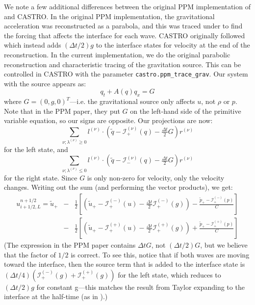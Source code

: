 \documentclass[iop]{../emulateapj}
\newcommand{\evm}{{(-)}}
\newcommand{\evp}{{(+)}}
\newcommand{\enu}{{(\nu)}}
\begin{document}
We note a few additional differences between the original PPM
implementation of \citet{ppm} and CASTRO.  In the original PPM
implementation, the gravitational acceleration was reconstructed as a parabola, and
this was traced under to find the forcing that affects the interface
for each wave.  CASTRO originally followed \citet{ppmunsplit} which instead adds
$(\Delta t/2)g$ to the interface states for velocity at the end of the
reconstruction.  In the current implementation, we do the original
parabolic reconstruction and characteristic tracing of the gravitation
source. This can be controlled in CASTRO with the parameter 
{\tt castro.ppm\_trace\_grav}. Our system with the source appears as:
\begin{equation}
q_t + A(q) q_x = G
\end{equation}
where $G = (0, g, 0)^T$---i.e. the gravitational source only affects
$u$, not $\rho$ or $p$.  Note that in the PPM paper, they put $G$ on 
the left-hand side of the primitive variable equation, so our signs are
opposite.  Our projections are now:
\begin{equation}
\sum_{\nu; \lambda^\enu \ge 0}l^\enu \cdot (\tilde{q} - \mathcal{I}^\enu_+(q) - \tfrac{\Delta t}{2} G) r^\enu
\end{equation}
for the left state, and
\begin{equation}
\sum_{\nu; \lambda^\enu \le 0} l^\enu \cdot (\tilde{q} - \mathcal{I}^\enu_-(q) - \tfrac{\Delta t}{2} G) r^\enu 
\end{equation}
for the right state.  Since $G$ is only non-zero for velocity, only
the velocity changes.  Writing out the sum (and performing the vector products), we
get:
\begin{eqnarray}
u_{i+1/2,L}^{n+1/2} =
   \tilde{u}_+ 
  &-& \frac{1}{2} \left [
      \left (\tilde{u}_+ - \mathcal{I}_+^\evm(u) - \frac{\Delta t}{2} \mathcal{I}^\evm_+(g) \right ) - 
       \frac{\tilde{p}_+ - \mathcal{I}_+^\evm(p)}{C} \right ] \nonumber \\
  &-& \frac{1}{2} \left [
      \left (\tilde{u}_+ - \mathcal{I}_+^\evp(u) - \frac{\Delta t}{2} \mathcal{I}^\evp_+(g) \right ) +
       \frac{\tilde{p}_+ - \mathcal{I}_+^\evp(p)}{C} \right ]
\end{eqnarray}
(The expression in the PPM paper contains $\Delta t G$, not $(\Delta t/2) G$,
but we believe that the factor of $1/2$ is correct.  To see this, notice that if both
waves are moving toward the interface, then the source term that is
added to the interface state is $(\Delta t/4) (\mathcal{I}_+^\evm(g) +
\mathcal{I}_+^\evp(g))$ for the left state, which reduces to $(\Delta
t/2) g$ for constant g---this matches the result from Taylor
expanding to the interface at the half-time (as in \citealt{ppmunsplit}).)
\end{document}
